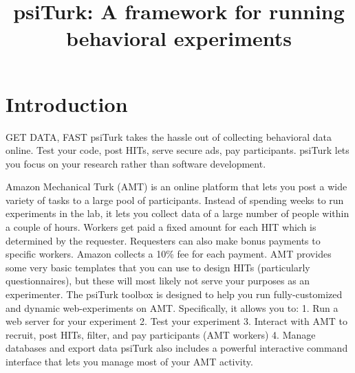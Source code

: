 \documentclass[jou,apacite]{apa6}
\title{psiTurk: A framework for running behavioral experiments}
\begin{document}
\maketitle
\section{Introduction}
GET DATA, FAST
psiTurk takes the hassle out of collecting behavioral data online.
Test your code, post HITs, serve secure ads, pay participants.
psiTurk lets you focus on your research rather than software development.

Amazon Mechanical Turk (AMT) is an online platform that lets you post a wide variety of tasks to a large pool of participants.
Instead of spending weeks to run experiments in the lab, it lets you collect data of a large number of people within a couple of hours.
Workers get paid a fixed amount for each HIT which is determined by the requester.
Requesters can also make bonus payments to specific workers. Amazon collects a 10\% fee for each payment.
AMT provides some very basic templates that you can use to design HITs (particularly questionnaires), but these will most likely not serve your purposes as an experimenter.
The psiTurk toolbox is designed to help you run fully-customized and dynamic web-experiments on AMT.
Specifically, it allows you to:
1. Run a web server for your experiment
2. Test your experiment
3. Interact with AMT to recruit, post HITs, filter, and pay participants (AMT workers)
4. Manage databases and export data
psiTurk also includes a powerful interactive command interface that lets you manage most of your AMT activity.
\end{document}
